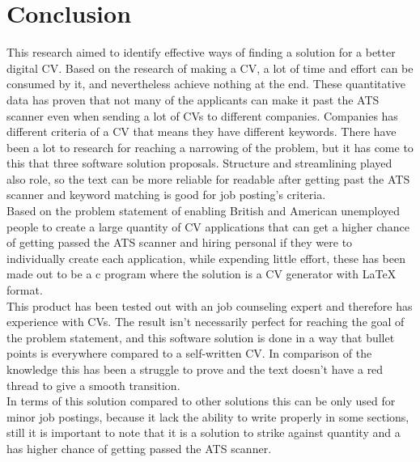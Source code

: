 \section{Conclusion}\label{sec:conclusion}
This research aimed to identify effective ways of finding a solution for a better digital CV.
Based on the research of making a CV, a lot of time and effort can be consumed by it,
and nevertheless achieve nothing at the end.
These quantitative data has proven that not many of the applicants can make it past the ATS scanner 
even when sending a lot of CVs to different companies.
Companies has different criteria of a CV that means they have different keywords. 
There have been a lot to research for reaching a narrowing of the problem, 
but it has come to this that three software solution proposals.
Structure and streamlining played also role, so the text can be more reliable for readable after getting past the ATS scanner
and keyword matching is good for job posting's criteria. \\

Based on the problem statement of enabling British and American unemployed people to create a large quantity of CV applications 
that can get a higher chance of getting passed the ATS scanner and hiring personal 
if they were to individually create each application, while expending little effort, 
these has been made out to be a c program where the solution is a CV generator with LaTeX format. \\

This product has been tested out with an job counseling expert and therefore has experience with CVs. 
The result isn't necessarily perfect for reaching the goal of the problem statement, 
and this software solution is done in a way that bullet points is everywhere compared to a self-written CV.
In comparison of the knowledge this has been a struggle to prove and the text doesn't have a red thread to give a smooth transition. \\

In terms of this solution compared to other solutions this can be only used for minor job postings, 
because it lack the ability to write properly in some sections, 
still it is important to note that it is a solution to strike against quantity 
and a has higher chance of getting passed the ATS scanner.


\clearpage